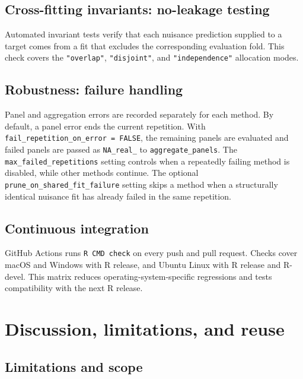 \subsection{Cross-fitting invariants: no-leakage testing}\label{cross-fitting-invariants-no-leakage-testing}

Automated invariant tests verify that each nuisance prediction supplied to a target comes from a fit that excludes the corresponding evaluation fold. This check covers the \texttt{"overlap"}, \texttt{"disjoint"}, and \texttt{"independence"} allocation modes.

\subsection{Robustness: failure handling}\label{robustness-failure-handling}

Panel and aggregation errors are recorded separately for each method. By default, a panel error ends the current repetition. With \texttt{fail\_repetition\_on\_error\ =\ FALSE}, the remaining panels are evaluated and failed panels are passed as \texttt{NA\_real\_} to \texttt{aggregate\_panels}. The \texttt{max\_failed\_repetitions} setting controls when a repeatedly failing method is disabled, while other methods continue. The optional \texttt{prune\_on\_shared\_fit\_failure} setting skips a method when a structurally identical nuisance fit has already failed in the same repetition.

\subsection{Continuous integration}\label{continuous-integration}

GitHub Actions runs \texttt{R\ CMD\ check} on every push and pull request. Checks cover macOS and Windows with R release, and Ubuntu Linux with R release and R-devel. This matrix reduces operating-system-specific regressions and tests compatibility with the next R release.

\section{Discussion, limitations, and reuse}\label{sec:discussion}

\subsection{Limitations and scope}\label{limitations-and-scope}

